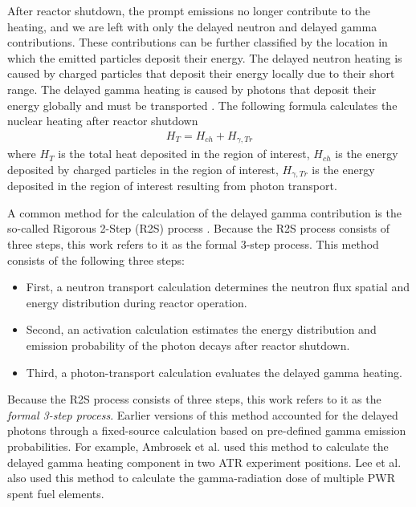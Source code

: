 After reactor shutdown, the prompt emissions no longer contribute to the heating, and we are left with only the delayed neutron and delayed gamma contributions.
These contributions can be further classified by the location in which the emitted particles deposit their energy.
The delayed neutron heating is caused by charged particles that deposit their energy locally due to their short range.
The delayed gamma heating is caused by photons that deposit their energy globally and must be transported \cite{peterson-droogh_current_2018}.
The following formula calculates the nuclear heating after reactor shutdown
\begin{align}
H_{T} = H_{ch} + H_{\gamma, Tr} \label{eq:heat}
\end{align}
where $H_{T}$ is the total heat deposited in the region of interest, $H_{ch}$ is the energy deposited by charged particles in the region of interest, $H_{\gamma, Tr}$ is the energy deposited in the region of interest resulting from photon transport.

A common method for the calculation of the delayed gamma contribution is the so-called Rigorous 2-Step (R2S) process \cite{chen_rigorous_2002}.
Because the R2S process consists of three steps, this work refers to it as the formal 3-step process.
This method consists of the following three steps:
\begin{itemize}
  \item First, a neutron transport calculation determines the neutron flux spatial and energy distribution during reactor operation.
  \item Second, an activation calculation estimates the energy distribution and emission probability of the photon decays after reactor shutdown.
  \item Third, a photon-transport calculation evaluates the delayed gamma heating.
\end{itemize}
Because the R2S process consists of three steps, this work refers to it as the \textit{formal 3-step process}.
Earlier versions of this method accounted for the delayed photons through a fixed-source calculation based on pre-defined gamma emission probabilities.
For example, Ambrosek et al. \cite{ambrosek_improved_1995} used this method to calculate the delayed gamma heating component in two ATR experiment positions.
Lee et al. \cite{lee_tripoli_2013} also used this method to calculate the gamma-radiation dose of multiple \gls*{PWR} spent fuel elements.

